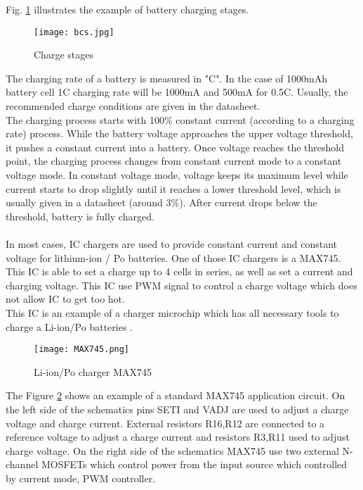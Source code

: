Fig. \ref{fig: bcs} illustrates the example of battery charging stages.

\begin{figure}[h]
	\centering
	\texttt{[image: bcs.jpg]}
	\caption{ Charge stages \cite{14}}
	\label{fig: bcs}
\end{figure}
 The charging rate of a battery is measured in "C". In the case of 1000mAh battery cell 1C charging rate will be 1000mA and 500mA for 0.5C. Usually, the recommended charge conditions are given in the datasheet.\\
 The charging process starts with 100\%  constant current (according to a charging rate) process. While the battery voltage approaches the upper voltage threshold, it pushes a constant current into a battery. Once voltage reaches the threshold point, the charging process changes from constant current mode to a constant voltage mode. In constant voltage mode, voltage keeps its maximum level while current starts to drop slightly until it reaches a lower threshold level, which is usually given in a datasheet (around 3\%). After current drops below the threshold, battery is fully charged. \\ \\
 In most cases, IC chargers are used to provide constant current and constant voltage for lithium-ion / Po batteries.  One of those IC chargers is a MAX745. 
This IC is able to set a charge up to 4 cells in series, as well as set a current and charging voltage. This IC use PWM signal to control a charge voltage which does not allow IC to get too hot.\\ This IC is an example of a charger microchip which has all necessary  tools to charge a Li-ion/Po batteries \cite{15}. 



\begin{figure}[h]
	\centering
	\texttt{[image: MAX745.png]}
	\caption{ Li-ion/Po charger MAX745 \cite{15}}
	\label{fig: EPS22}
\end{figure}

The Figure \ref{fig: EPS22} shows an example of a standard MAX745 application circuit. On the left side of the schematics pins SETI and VADJ are used to adjust a charge voltage and charge current. External resistors R16,R12 are connected to a reference voltage to adjust a charge current and resistors R3,R11  used to adjust charge voltage. On the right side of the schematics MAX745 use two external N-channel MOSFETs which control power from the input source which controlled by current mode, PWM controller. 




